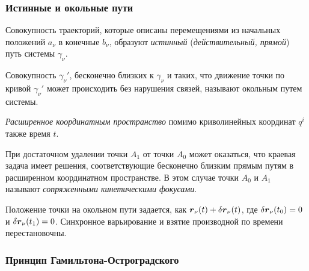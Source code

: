\subsubsection*{Истинные и окольные пути}

\begin{to_def} 
    Совокупность траекторий, которые описаны перемещениями из начальных положений $a_\nu$ в конечные $b_\nu$, образуют \textit{истинный} (\textit{действительный, прямой}) путь системы $\gamma_\nu$.

    Совокупность $\gamma_\nu'$, бесконечно близких к $\gamma_\nu$ и таких, что движение точки по кривой $\gamma_\nu'$ может происходить без нарушения связей, называют окольным путем системы.
\end{to_def}

\begin{to_def} 
    \textit{Расширенное координатным пространство} помимо криволинейных координат $q^i$ также время $t$.
\end{to_def}

\begin{to_def} 
    При достаточном удалении точки $A_1$ от точки $A_0$ может оказаться, что краевая задача имеет решения, соответствующие бесконечно близким прямым путям в расширенном координатном пространстве. В этом случае точки $A_0$ и $A_1$ называют \textit{сопряженными кинетическими фокусами}. 
\end{to_def}

\begin{to_lem} 
    Положение точки на окольном пути задается, как $\mbox{\boldmath $r$}_\nu (t) + \delta \mbox{\boldmath $r$}_\nu(t)$, где $\delta \mbox{\boldmath $r$}_\nu (t_0) = 0$ и $\delta \mbox{\boldmath $r$}_\nu (t_1) = 0$. Синхронное варьирование и взятие производной по времени перестановочны. 
\end{to_lem}

\subsubsection*{Принцип Гамильтона-Остроградского}

